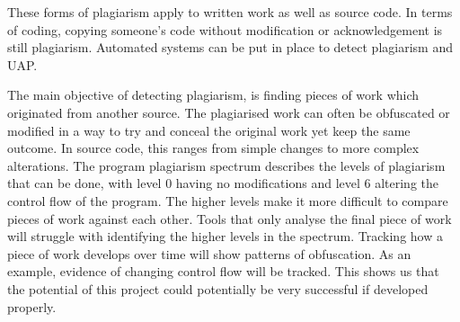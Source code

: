 These forms of plagiarism apply to written work as well as source code. In terms of coding, copying someone's code without modification or acknowledgement is still plagiarism. Automated systems can be put in place to detect plagiarism and UAP.

The main objective of detecting plagiarism, is finding pieces of work which originated from another source. The plagiarised work can often be obfuscated or modified in a way to try and conceal the original work yet keep the same outcome. In source code, this ranges from simple changes to more complex alterations. The program plagiarism spectrum describes the levels of plagiarism that can be done, with level 0 having no modifications and level 6 altering the control flow of the program\cite{Parker1989}. The higher levels make it more difficult to compare pieces of work against each other. Tools that only analyse the final piece of work will struggle with identifying the higher levels in the spectrum. Tracking how a piece of work develops over time will show patterns of obfuscation. As an example, evidence of changing control flow will be tracked. This shows us that the potential of this project could potentially be very successful if developed properly.

